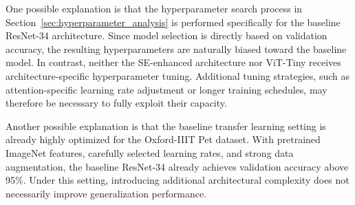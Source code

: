 One possible explanation is that the hyperparameter search process in Section~\ref{sec:hyperparameter_analysis} is performed specifically for the baseline ResNet-34 architecture. Since model selection is directly based on validation accuracy, the resulting hyperparameters are naturally biased toward the baseline model. In contrast, neither the SE-enhanced architecture nor ViT-Tiny receives architecture-specific hyperparameter tuning. Additional tuning strategies, such as attention-specific learning rate adjustment or longer training schedules, may therefore be necessary to fully exploit their capacity.

Another possible explanation is that the baseline transfer learning setting is already highly optimized for the Oxford-IIIT Pet dataset. With pretrained ImageNet features, carefully selected learning rates, and strong data augmentation, the baseline ResNet-34 already achieves validation accuracy above 95\%. Under this setting, introducing additional architectural complexity does not necessarily improve generalization performance.
